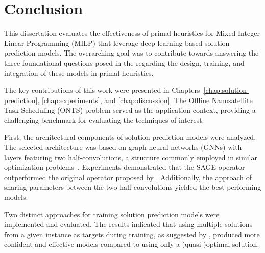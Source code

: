 % 

\chapter*{Conclusion}\label{conclusion}


This dissertation evaluates the effectiveness of primal heuristics for Mixed-Integer Linear Programming (MILP) that leverage deep learning-based solution prediction models.
The overarching goal was to contribute towards answering the three foundational questions posed in the  regarding the design, training, and integration of these models in primal heuristics.

The key contributions of this work were presented in Chapters~\ref{chap:solution-prediction}, \ref{chap:experiments}, and \ref{chap:discussion}.
The Offline Nanosatellite Task Scheduling (ONTS) problem served as the application context, providing a challenging benchmark for evaluating the techniques of interest.

First, the architectural components of solution prediction models were analyzed.
The selected architecture was based on graph neural networks (GNNs) with layers featuring two half-convolutions, a structure commonly employed in similar optimization problems~\cite{gasseExactCombinatorialOptimization2019,nairSolvingMixedInteger2021,khalilMIPGNNDataDrivenFramework2022,cappartCombinatorialOptimizationReasoning2022}.
Experiments demonstrated that the SAGE operator~\cite{hamiltonInductiveRepresentationLearning2017} outperformed the original operator proposed by .
Additionally, the approach of sharing parameters between the two half-convolutions yielded the best-performing models.

Two distinct approaches for training solution prediction models were implemented and evaluated.
The results indicated that using multiple solutions from a given instance as targets during training, as suggested by , produced more confident and effective models compared to using only a (quasi-)optimal solution.

